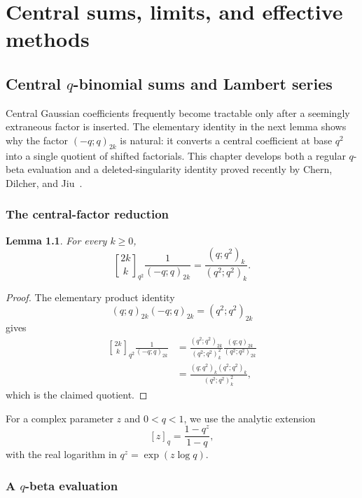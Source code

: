 \documentclass[11pt,oneside,openany]{book}
\newtheorem{lemma}[theorem]{Lemma}
\theoremstyle{definition}
\theoremstyle{remark}
\newcommand{\Qbinom}[3]{\genfrac{[}{]}{0pt}{}{#1}{#2}_{#3}}
\begin{document}
\part{Central sums, limits, and effective methods}

\chapter{Central \texorpdfstring{$q$}{q}-binomial sums and Lambert series}\label{chap:central}

Central Gaussian coefficients frequently become tractable only after a seemingly extraneous factor is inserted.  The elementary identity in the next lemma shows why the factor $(-q;q)_{2k}$ is natural: it converts a central coefficient at base $q^2$ into a single quotient of shifted factorials.  This chapter develops both a regular $q$-beta evaluation and a deleted-singularity identity proved recently by Chern, Dilcher, and Jiu~\cite{ChernDilcherJiu2026}.

\section{The central-factor reduction}

\begin{lemma}\label{lem:central-reduction}
For every $k\ge0$,
\[
 \Qbinom{2k}{k}{q^2}\frac1{(-q;q)_{2k}}
 =\frac{(q;q^2)_k}{(q^2;q^2)_k}.
 \tag{18.1}\label{eq:central-reduction}
\]
\end{lemma}

\begin{proof}
The elementary product identity
\[
 (q;q)_{2k}(-q;q)_{2k}=(q^2;q^2)_{2k}
\]
gives
\begin{align*}
 \Qbinom{2k}{k}{q^2}\frac1{(-q;q)_{2k}}
 &=\frac{(q^2;q^2)_{2k}}{(q^2;q^2)_k^2}
   \frac{(q;q)_{2k}}{(q^2;q^2)_{2k}}\\
 &=\frac{(q;q^2)_k(q^2;q^2)_k}{(q^2;q^2)_k^2},
\end{align*}
which is the claimed quotient.
\end{proof}

For a complex parameter $z$ and $0<q<1$, we use the analytic extension
\[
 [z]_q=\frac{1-q^z}{1-q},
\]
with the real logarithm in $q^z=\exp(z\log q)$.

\section{A \texorpdfstring{$q$}{q}-beta evaluation}
\end{document}
